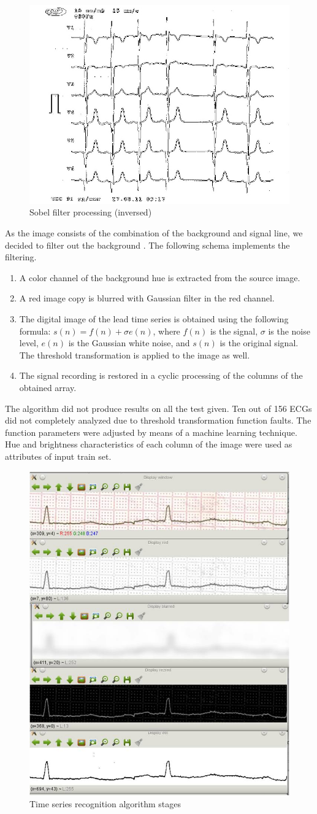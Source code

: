 \documentclass[runningheads]{AIIT}
\newcommand{\nnn}[2][rcolor]{\noindent%
\textcolor{eclr}{}\textcolor{#1}{#2}\textcolor{eclr}{}}
\begin{document}
\begin{figure}[htb]
  \centering
    \includegraphics[width=0.5\linewidth] {images/Sobel.jpg}
  \caption{Sobel filter processing (inversed)}
  \label{fig:sobel-ex}
\end{figure}

As the image consists of the combination of the background and signal line, we decided to filter out the background \cite{1}.  The following schema implements the filtering.
\begin{enumerate}
\item A color channel of the background hue is extracted from the source image.
\item A red image copy is blurred with Gaussian filter in the red channel.
\item The digital image of the lead time series is obtained using the following formula:
  $s(n)=f(n)+\sigma e(n)$, where $f(n)$ is the signal, $\sigma$ is the
  noise level, $e(n)$ is the Gaussian white noise, and $s(n)$ is the original
  signal.  The threshold transformation is applied to the image as well.
\item The signal recording is restored in a cyclic processing \nnn{of the columns of the obtained array.}
\end{enumerate}
The algorithm did not produce results on all the test given.  Ten out of 156 ECGs did not completely analyzed due to threshold transformation function faults.  The function parameters were adjusted by means of a machine learning technique.  Hue and brightness characteristics of each column of the image were used as attributes of input train set.

\begin{figure}[htb]
  \centering
    \includegraphics[width=0.5\linewidth] {images/Algorithm.jpg}
  \caption{Time series recognition algorithm stages}
  \label{fig:leads-ex}
\end{figure}
\end{document}
